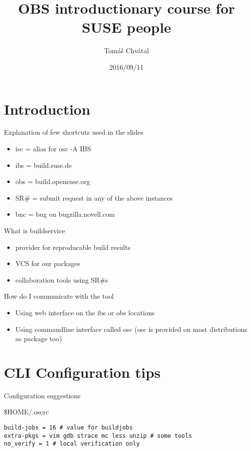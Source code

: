 \documentclass{beamer}
\author{Tom\'{a}\v{s} Chv\'{a}tal\newline {\small tchvatal@suse.com}\newline {\small L3-Packaging/Packaging}}
\title{OBS introductionary course for SUSE people}
\date{2016/09/11}
\begin{document}
\begin{frame}[t,plain]
\titlepage
\end{frame}

\section{Introduction}

\begin{frame}[t]{Explanation of few shortcuts used in the slides}
	\begin{itemize}
	\item isc = alias for osc -A IBS
	\item ibs = build.suse.de
	\item obs = build.opensuse.org
	\item SR\# = submit request in any of the above instances
	\item bnc = bug on bugzilla.novell.com
	\end{itemize}
\end{frame}

\begin{frame}[t]{What is buildservice}
	\begin{itemize}
	\item provider for reproducable build results
	\item VCS for our packages
	\item collaboration tools using SR\#s
	\end{itemize}
\end{frame}

\begin{frame}[t]{How do I communicate with the tool}
	\begin{itemize}
	\item Using web interface on the ibs or obs locations
	\item Using commandline interface called osc (osc is provided on most distributions as package too)
	\end{itemize}
\end{frame}

\section{CLI Configuration tips}

\begin{frame}[fragile]{Configuration suggestions}
	\begin{center}\$HOME/.oscrc\end{center}
	\begin{small}
	\begin{verbatim}
build-jobs = 16 # value for buildjobs
extra-pkgs = vim gdb strace mc less unzip # some tools
no_verify = 1 # local verification only
	\end{verbatim}
	\end{small}
\end{frame}
\end{document}
